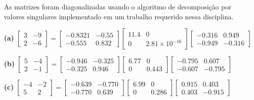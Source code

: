 \begin{resolution}
  As matrizes foram diagonalizadas usando o algoritmo de decomposição por valores singulares implementado em um trabalho requerido nessa disciplina.

  \vspace{12pt}
  {\bf (a)}\; $\begin{bmatrix}
      3 & -9 \\ 2 & -6
    \end{bmatrix} = \begin{bmatrix}
      -0.8321 & -0.55 \\
      -0.555   & 0.832
    \end{bmatrix} \begin{bmatrix}
      11.4 & 0 \\ 0 & 2.81 \times 10^{-16}
    \end{bmatrix} \begin{bmatrix}
      -0.316 & 0.949 \\ -0.949 & -0.316
    \end{bmatrix}$

  \vspace{12pt}
  {\bf (b)}\; $\begin{bmatrix}
      5 & -4 \\ 2 & -1
    \end{bmatrix} = \begin{bmatrix}
      -0.946 & -0.325 \\
      -0.325 & 0.946
    \end{bmatrix} \begin{bmatrix}
      6.77 & 0 \\ 0 & 0.443
    \end{bmatrix} \begin{bmatrix}
      -0.795 & 0.607 \\ -0.607 & -0.795
    \end{bmatrix}$

  \vspace{12pt}
  {\bf (c)}\; $\begin{bmatrix}
      -4 & -2 \\ 5 & 2
    \end{bmatrix} = \begin{bmatrix}
      -0.639 & -0.770 \\
      -0.770 & 0.639
    \end{bmatrix} \begin{bmatrix}
      6.99 & 0 \\ 0 & 0.286
    \end{bmatrix} \begin{bmatrix}
      0.915 & 0.403 \\ 0.403 & -0.915
    \end{bmatrix}$


\end{resolution}
